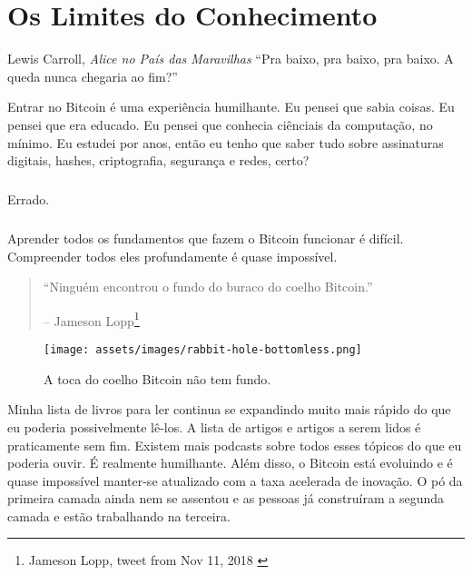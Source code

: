 \chapter{Os Limites do Conhecimento}
\label{les:7}

\begin{chapquote}{Lewis Carroll, \textit{Alice no País das Maravilhas}}
\enquote{Pra baixo, pra baixo, pra baixo. A queda nunca chegaria ao fim?}
\end{chapquote}

Entrar no Bitcoin é uma experiência humilhante. Eu pensei que sabia
coisas. Eu pensei que era educado. Eu pensei que conhecia 
ciênciais da computação, no mínimo. Eu estudei por anos, então eu tenho que saber
tudo sobre assinaturas digitais, hashes, criptografia, 
segurança e redes, certo?

\paragraph{}
Errado.

\paragraph{}
Aprender todos os fundamentos que fazem o Bitcoin funcionar é difícil.
Compreender todos eles profundamente é quase impossível.

\begin{quotation}\begin{samepage}
\enquote{Ninguém encontrou o fundo do buraco do coelho Bitcoin.}
\begin{flushright} -- Jameson Lopp\footnote{Jameson Lopp, tweet from Nov 11, 2018 \cite{lopp-tweet}}
\end{flushright}\end{samepage}\end{quotation}

\begin{figure}
  \centering
  \texttt{[image: assets/images/rabbit-hole-bottomless.png]}
  \caption{A toca do coelho Bitcoin não tem fundo.}
  \label{fig:rabbit-hole-bottomless}
\end{figure}

Minha lista de livros para ler continua se expandindo muito mais rápido do que eu poderia
possivelmente lê-los. A lista de artigos e artigos a serem lidos é praticamente
sem fim. Existem mais podcasts sobre todos esses tópicos do que eu poderia
ouvir. É realmente humilhante. Além disso, o Bitcoin está evoluindo e
é quase impossível manter-se atualizado com a taxa acelerada de
inovação. O pó da primeira camada ainda nem se assentou e
as pessoas já construíram a segunda camada e estão trabalhando na terceira.

